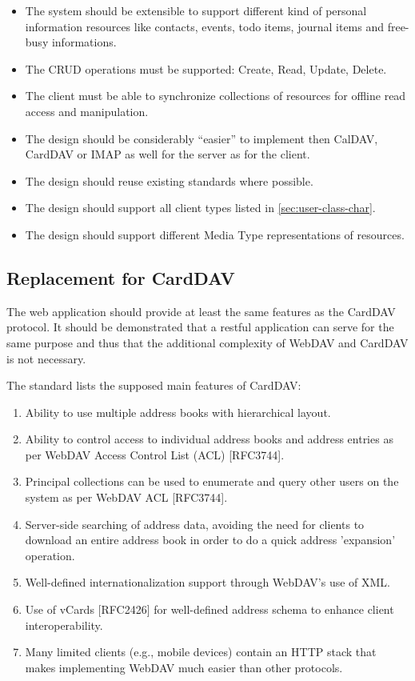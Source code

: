 \documentclass[12pt,a4paper]{scrartcl}		%
\begin{document}
\begin{itemize}
\item The system should be extensible to support different kind of personal
  information resources like contacts, events, todo items, journal items and
  free-busy informations.
  \item The CRUD operations must be supported: Create, Read, Update, Delete.
  \item The client must be able to synchronize collections of resources for
    offline read access and manipulation.
  \item The design should be considerably ``easier'' to implement then CalDAV,
    CardDAV or IMAP as well for the server as for the client.
  \item The design should reuse existing standards where possible.
  \item The design should support all client types listed in
    \autoref{sec:user-class-char}.
  \item The design should support different Media Type representations of
    resources.
\end{itemize}


\subsection{Replacement for CardDAV}

The web application should provide at least the same features as the CardDAV
protocol. It should be demonstrated that a restful application can serve for the
same purpose and thus that the additional complexity of WebDAV and CardDAV is
not necessary.

The standard lists the supposed main features of CardDAV\cite[sec. 1]{RFC6352}:

\begin{enumerate}
\item Ability to use multiple address books with hierarchical layout.
\item Ability to control access to individual address books and address entries
  as per WebDAV Access Control List (ACL) [RFC3744].
\item Principal collections can be used to enumerate and query other users on
  the system as per WebDAV ACL [RFC3744].
\item Server-side searching of address data, avoiding the need for clients to
  download an entire address book in order to do a quick address 'expansion'
  operation.
\item Well-defined internationalization support through WebDAV's use of XML.
\item Use of vCards [RFC2426] for well-defined address schema to enhance client
  interoperability.
\item Many limited clients (e.g., mobile devices) contain an HTTP stack that
  makes implementing WebDAV much easier than other protocols.
\end{enumerate}
\end{document}
